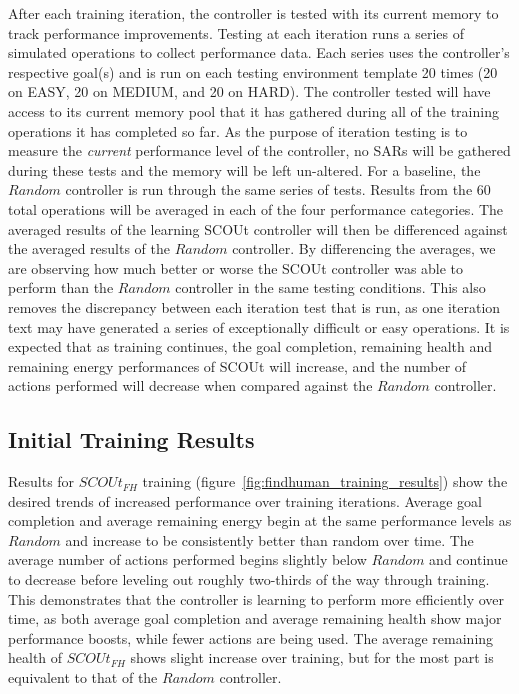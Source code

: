 After each training iteration, the controller is tested with its current memory to track performance improvements.
Testing at each iteration runs a series of simulated operations to collect performance data.
Each series uses the controller's respective goal(s) and is run on each testing environment template 20 times (20 on EASY, 20 on MEDIUM, and 20 on HARD).
The controller tested will have access to its current memory pool that it has gathered during all of the training operations it has completed so far.
As the purpose of iteration testing is to measure the \textit{current} performance level of the controller, no SARs will be gathered during these tests and the memory will be left un-altered.
For a baseline, the $Random$ controller is run through the same series of tests.
Results from the 60 total operations will be averaged in each of the four performance categories.
The averaged results of the learning SCOUt controller will then be differenced against the averaged results of the $Random$ controller.
By differencing the averages, we are observing how much better or worse the SCOUt controller was able to perform than the $Random$ controller in the same testing conditions.
This also removes the discrepancy between each iteration test that is run, as one iteration text may have generated a series of exceptionally difficult or easy operations.
It is expected that as training continues, the goal completion, remaining health and remaining energy performances of SCOUt will increase, and the number of actions performed will decrease when compared against the $Random$ controller.

\subsection{Initial Training Results}
Results for $SCOUt_{FH}$ training (figure~\ref{fig:findhuman_training_results}) show the desired trends of increased performance over training iterations.
Average goal completion and average remaining energy begin at the same performance levels as $Random$ and increase to be consistently better than random over time.
The average number of actions performed begins slightly below $Random$ and continue to decrease before leveling out roughly two-thirds of the way through training.
This demonstrates that the controller is learning to perform more efficiently over time, as both average goal completion and average remaining health show major performance boosts, while fewer actions are being used.
The average remaining health of $SCOUt_{FH}$ shows slight increase over training, but for the most part is equivalent to that of the $Random$ controller.

